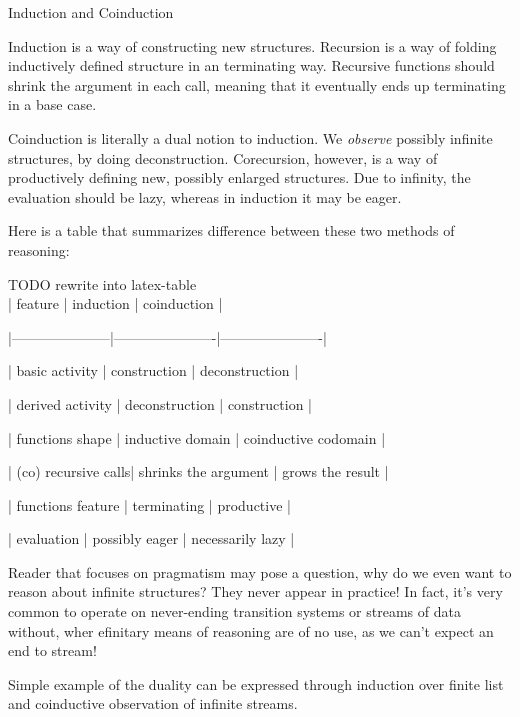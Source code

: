 \documentclass[declaration,shortabstract]{iithesis}
\theoremstyle{definition} \newtheorem{definition}{Definition}[chapter]
\theoremstyle{remark} \newtheorem{remark}[definition]{Observation}
\theoremstyle{plain} \newtheorem{theorem}[definition]{Theorem}
\theoremstyle{plain} \newtheorem{lemma}[definition]{Lemma}
\begin{document}
    Induction and Coinduction

    Induction is a way of constructing new structures. Recursion is a way of
    folding inductively defined structure in an terminating way. Recursive functions
    should shrink the argument in each call, meaning that it eventually ends up
    terminating in a base case.

    Coinduction is literally a dual notion to induction. We \textit{observe} possibly
    infinite structures, by doing deconstruction. Corecursion, however, is a way
    of productively defining new, possibly enlarged structures. Due to infinity,
    the evaluation should be lazy, whereas in induction it may be eager.

    Here is a table that summarizes difference between these two methods of reasoning:

    \begin{grammar}

    TODO rewrite into latex-table \\

    | feature             | induction            | coinduction          |

    |---------------------|----------------------|----------------------|

    | basic activity      | construction         | deconstruction       |

    | derived activity    | deconstruction       | construction         |

    | functions shape     | inductive domain     | coinductive codomain |

    | (co) recursive calls| shrinks the argument | grows the result     |

    | functions feature   | terminating          | productive           |

    | evaluation          | possibly eager       | necessarily lazy     |

    \end{grammar}

    Reader that focuses on pragmatism may pose a question, why do we even want
    to reason about infinite structures? They never appear in practice! In fact,
    it's very common to operate on never-ending transition systems or streams of
    data without, wher efinitary means of reasoning are of no use, as we can’t
    expect an end to stream!

    Simple example of the duality can be expressed through induction over finite
    list and coinductive observation of infinite streams.
\end{document}

